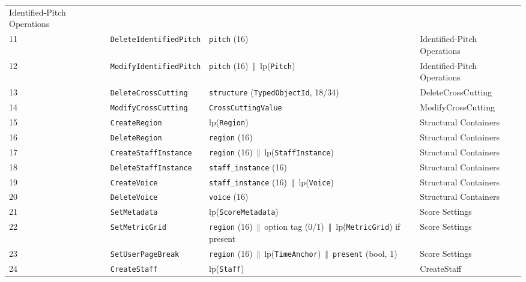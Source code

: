 \documentclass[11pt,letterpaper]{report}
\newcommand{\tablenums}[1]{{\addfontfeatures{Numbers={Lining,Tabular}}#1}}
\newcommand{\sectionsc}[1]{{\addfontfeatures{Letters=SmallCaps}#1}}
\newcommand{\cat}{\ensuremath{\,\Vert\,}}
\begin{document}
\begin{longtable}{p{0.32in} >{\raggedright\arraybackslash}p{1.5in} >{\raggedright\arraybackslash}p{2.35in} >{\raggedright\arraybackslash}p{1.35in}}
    \sectionsc{Identified-Pitch Operations} \\
  \tablenums{11} & \texttt{DeleteIdentifiedPitch} &
    \texttt{pitch} (16) &
    \sectionsc{Identified-Pitch Operations} \\
  \tablenums{12} & \texttt{ModifyIdentifiedPitch} &
    \texttt{pitch} (16) \cat{} $\mathrm{lp}$(\texttt{Pitch}) &
    \sectionsc{Identified-Pitch Operations} \\
  \tablenums{13} & \texttt{DeleteCrossCutting} &
    \texttt{structure} (\texttt{TypedObjectId}, 18/34) &
    \sectionsc{DeleteCrossCutting} \\
  \tablenums{14} & \texttt{ModifyCrossCutting} &
    \texttt{CrossCuttingValue} &
    \sectionsc{ModifyCrossCutting} \\
  \tablenums{15} & \texttt{CreateRegion} &
    $\mathrm{lp}$(\texttt{Region}) &
    \sectionsc{Structural Containers} \\
  \tablenums{16} & \texttt{DeleteRegion} &
    \texttt{region} (16) &
    \sectionsc{Structural Containers} \\
  \tablenums{17} & \texttt{CreateStaffInstance} &
    \texttt{region} (16) \cat{} $\mathrm{lp}$(\texttt{StaffInstance}) &
    \sectionsc{Structural Containers} \\
  \tablenums{18} & \texttt{DeleteStaffInstance} &
    \texttt{staff\_instance} (16) &
    \sectionsc{Structural Containers} \\
  \tablenums{19} & \texttt{CreateVoice} &
    \texttt{staff\_instance} (16) \cat{} $\mathrm{lp}$(\texttt{Voice}) &
    \sectionsc{Structural Containers} \\
  \tablenums{20} & \texttt{DeleteVoice} &
    \texttt{voice} (16) &
    \sectionsc{Structural Containers} \\
  \tablenums{21} & \texttt{SetMetadata} &
    $\mathrm{lp}$(\texttt{ScoreMetadata}) &
    \sectionsc{Score Settings} \\
  \tablenums{22} & \texttt{SetMetricGrid} &
    \texttt{region} (16) \cat{} option tag (\tablenums{0}/\tablenums{1})
    \cat{} $\mathrm{lp}$(\texttt{MetricGrid}) if present &
    \sectionsc{Score Settings} \\
  \tablenums{23} & \texttt{SetUserPageBreak} &
    \texttt{region} (16) \cat{} $\mathrm{lp}$(\texttt{TimeAnchor}) \cat{}
    \texttt{present} (bool, 1) &
    \sectionsc{Score Settings} \\
  \tablenums{24} & \texttt{CreateStaff} &
    $\mathrm{lp}$(\texttt{Staff}) &
    \sectionsc{CreateStaff} \\

\end{longtable}
\end{document}
